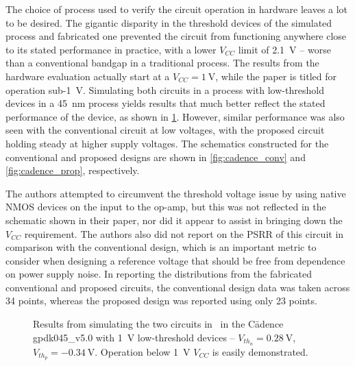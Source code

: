 \documentclass[journal]{IEEEtran}
\begin{document}
The choice of process used to verify the circuit operation in hardware leaves a lot to be desired. The gigantic disparity in the threshold devices of the simulated process and fabricated one prevented the circuit from functioning anywhere close to its stated performance in practice, with a lower \(V_{CC}\) limit of \qty{2.1}{\V} -- worse than a conventional bandgap in a traditional process. The results from the hardware evaluation actually start at a \(V_{CC} = \qty{1}{\V}\), while the paper is titled for operation sub-\qty{1}{\V}. Simulating both circuits in a process with low-threshold devices in a \qty{45}{\nm} process yields results that much better reflect the stated performance of the device, as shown in \cref{fig:gpdk_bandgap_results}. However, similar performance was also seen with the conventional circuit at low voltages, with the proposed circuit holding steady at higher supply voltages. The schematics constructed for the conventional and proposed designs are shown in \cref{fig:cadence_conv} and \cref{fig:cadence_prop}, respectively.

The authors attempted to circumvent the threshold voltage issue by using native NMOS devices on the input to the op-amp, but this was not reflected in the schematic shown in their paper, nor did it appear to assist in bringing down the \(V_{CC}\) requirement. The authors also did not report on the PSRR of this circuit in comparison with the conventional design, which is an important metric to consider when designing a reference voltage that should be free from dependence on power supply noise. In reporting the distributions from the fabricated conventional and proposed circuits, the conventional design data was taken across 34 points, whereas the proposed design was reported using only 23 points.

\begin{figure}[!t]
    \centering
    \datatable
    \caption{Results from simulating the two circuits in~\cite{Banba1999} in the C\=adence gpdk045\_v5.0 with \qty{1}{\V} low-threshold devices -- \(V_{th_n} = \qty{0.28}{\V}\), \(V_{th_p} = \qty{-0.34}{\V}\). Operation below \qty{1}{\V} \(V_{CC}\) is easily demonstrated.}\label{fig:gpdk_bandgap_results}
\end{figure}
\end{document}
